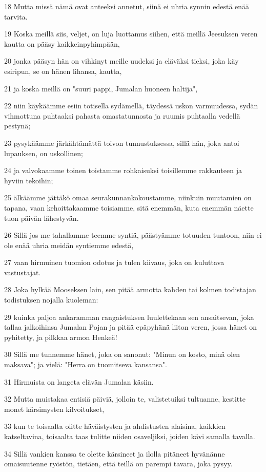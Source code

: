 \par 18 Mutta missä nämä ovat anteeksi annetut, siinä ei uhria synnin edestä enää tarvita.
\par 19 Koska meillä siis, veljet, on luja luottamus siihen, että meillä Jeesuksen veren kautta on pääsy kaikkeinpyhimpään,
\par 20 jonka pääsyn hän on vihkinyt meille uudeksi ja eläväksi tieksi, joka käy esiripun, se on hänen lihansa, kautta,
\par 21 ja koska meillä on "suuri pappi, Jumalan huoneen haltija",
\par 22 niin käykäämme esiin totisella sydämellä, täydessä uskon varmuudessa, sydän vihmottuna puhtaaksi pahasta omastatunnosta ja ruumis puhtaalla vedellä pestynä;
\par 23 pysykäämme järkähtämättä toivon tunnustuksessa, sillä hän, joka antoi lupauksen, on uskollinen;
\par 24 ja valvokaamme toinen toistamme rohkaisuksi toisillemme rakkauteen ja hyviin tekoihin;
\par 25 älkäämme jättäkö omaa seurakunnankokoustamme, niinkuin muutamien on tapana, vaan kehoittakaamme toisiamme, sitä enemmän, kuta enemmän näette tuon päivän lähestyvän.
\par 26 Sillä jos me tahallamme teemme syntiä, päästyämme totuuden tuntoon, niin ei ole enää uhria meidän syntiemme edestä,
\par 27 vaan hirmuinen tuomion odotus ja tulen kiivaus, joka on kuluttava vastustajat.
\par 28 Joka hylkää Mooseksen lain, sen pitää armotta kahden tai kolmen todistajan todistuksen nojalla kuoleman:
\par 29 kuinka paljoa ankaramman rangaistuksen luulettekaan sen ansaitsevan, joka tallaa jalkoihinsa Jumalan Pojan ja pitää epäpyhänä liiton veren, jossa hänet on pyhitetty, ja pilkkaa armon Henkeä!
\par 30 Sillä me tunnemme hänet, joka on sanonut: "Minun on kosto, minä olen maksava"; ja vielä: "Herra on tuomitseva kansansa".
\par 31 Hirmuista on langeta elävän Jumalan käsiin.
\par 32 Mutta muistakaa entisiä päiviä, jolloin te, valistetuiksi tultuanne, kestitte monet kärsimysten kilvoitukset,
\par 33 kun te toisaalta olitte häväistysten ja ahdistusten alaisina, kaikkien katseltavina, toisaalta taas tulitte niiden osaveljiksi, joiden kävi samalla tavalla.
\par 34 Sillä vankien kanssa te olette kärsineet ja ilolla pitäneet hyvänänne omaisuutenne ryöstön, tietäen, että teillä on parempi tavara, joka pysyy.
